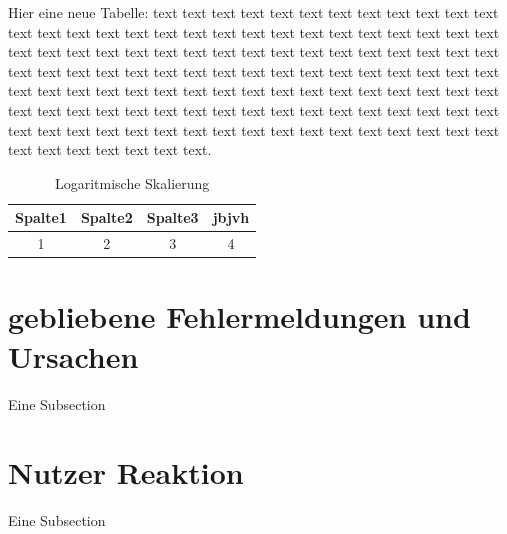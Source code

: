 Hier eine neue Tabelle: text text text text text text text text text text text text text text text text text text text text text text text text text text text text text text text text text text text text text text text text text text text text text text text text text text text text text text text text text text text text text text text text text text text text text text text text text text text text text text text text text text text text text text text text text text text text text text text text text text text text text text text text text text text text text text text text text text text text text text text text text.   
            
            \begin{table}[h]
                \begin{tabular}{cccc}
                      \hline
                      Spalte1 & Spalte2 & Spalte3 & jbjvh\\                      
                      \hline
                      1 & 2 & 3 & 4\\
                      \hline
                \end{tabular}
                \centering
                \caption{Logaritmische Skalierung}
                \label{Tab:Logaritmische Skalierung}
            \end{table}
 
        
        
    \section{gebliebene Fehlermeldungen und Ursachen}
        Eine Subsection
	\section{Nutzer Reaktion}
        Eine Subsection
  
